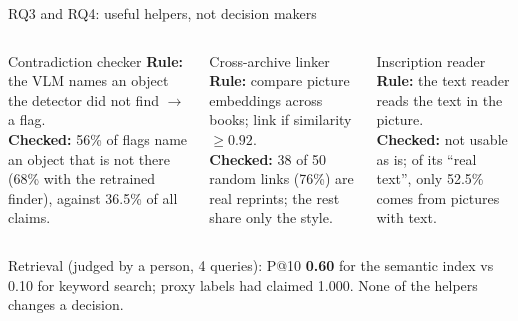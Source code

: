 \documentclass[aspectratio=169,10pt]{beamer}
\newcommand{\takeaway}[1]{\vfill\begin{keybox}#1\end{keybox}}
\begin{document}
\begin{frame}{RQ3 and RQ4: useful helpers, not decision makers}
\begin{columns}[T,onlytextwidth]
\begin{defbox}{Contradiction checker}
\textbf{Rule:} the VLM names an object the detector did not find $\to$ a flag.\\[2pt]
\textbf{Checked:} 56\% of flags name an object that is not there (68\% with the retrained finder), against 36.5\% of all claims.
\end{defbox}
\begin{defbox}{Cross-archive linker}
\textbf{Rule:} compare picture embeddings across books; link if similarity $\geq 0.92$.\\[2pt]
\textbf{Checked:} 38 of 50 random links (76\%) are real reprints; the rest share only the style.
\end{defbox}
\begin{defbox}{Inscription reader}
\textbf{Rule:} the text reader reads the text in the picture.\\[2pt]
\textbf{Checked:} not usable as is; of its ``real text'', only 52.5\% comes from pictures with text.
\end{defbox}
\end{columns}
\takeaway{Retrieval (judged by a person, 4 queries): P@10 \textbf{0.60} for the semantic index vs 0.10 for keyword search; proxy labels had claimed 1.000. None of the helpers changes a decision.}
\end{frame}
\end{document}
